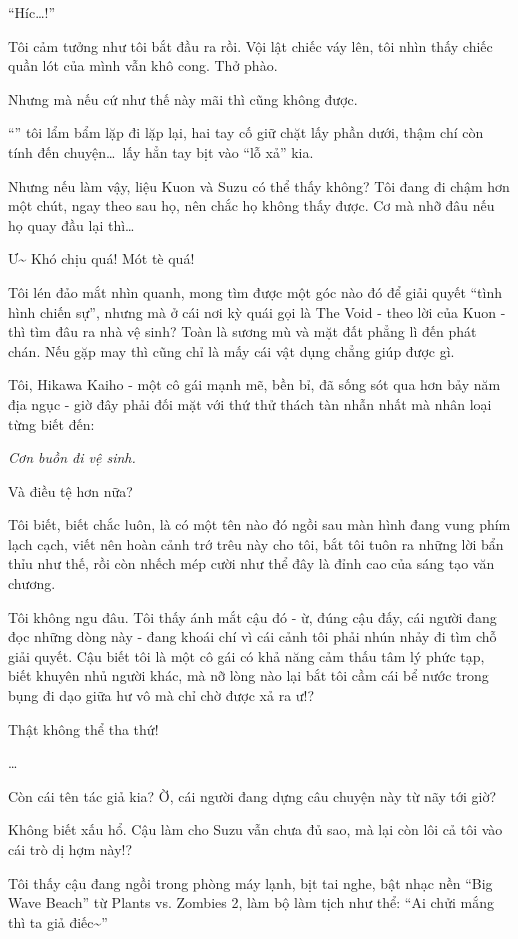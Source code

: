 \documentclass[../main.tex]{subfiles}
\begin{document}
``Híc\dots!''

Tôi cảm tưởng như tôi bắt đầu ra rồi. Vội lật chiếc váy lên, tôi nhìn thấy chiếc quần lót của mình vẫn khô cong. Thở phào.

Nhưng mà nếu cứ như thế này mãi thì cũng không được.

``'' tôi lẩm bẩm lặp đi lặp lại, hai tay cố giữ chặt lấy phần dưới, thậm chí còn tính đến chuyện\dots\ lấy hẳn tay bịt vào ``lỗ xả'' kia.

Nhưng nếu làm vậy, liệu Kuon và Suzu có thể thấy không? Tôi đang đi chậm hơn một chút, ngay theo sau họ, nên chắc họ không thấy được. Cơ mà nhỡ đâu nếu họ quay đầu lại thì\dots

Ư\~{} Khó chịu quá! Mót tè quá!

Tôi lén đảo mắt nhìn quanh, mong tìm được một góc nào đó để giải quyết ``tình hình chiến sự'', nhưng mà ở cái nơi kỳ quái gọi là The Void  - theo lời của Kuon - thì tìm đâu ra nhà vệ sinh? Toàn là sương mù và mặt đất phẳng lì đến phát chán. Nếu gặp may thì cũng chỉ là mấy cái vật dụng chẳng giúp được gì.

Tôi, Hikawa Kaiho - một cô gái mạnh mẽ, bền bỉ, đã sống sót qua hơn bảy năm địa ngục - giờ đây phải đối mặt với thứ thử thách tàn nhẫn nhất mà nhân loại từng biết đến:

\emph{Cơn buồn đi vệ sinh.}

Và điều tệ hơn nữa?

Tôi biết, biết chắc luôn, là có một tên nào đó ngồi sau màn hình đang vung phím lạch cạch, viết nên hoàn cảnh trớ trêu này cho tôi, bắt tôi tuôn ra những lời bẩn thỉu như thế, rồi còn nhếch mép cười như thể đây là đỉnh cao của sáng tạo văn chương.

Tôi không ngu đâu. Tôi thấy ánh mắt cậu đó - ừ, đúng cậu đấy, cái người đang đọc những dòng này - đang khoái chí vì cái cảnh tôi phải nhún nhảy đi tìm chỗ giải quyết. Cậu biết tôi là một cô gái có khả năng cảm thấu tâm lý phức tạp, biết khuyên nhủ người khác, mà nỡ lòng nào lại bắt tôi cầm cái bể nước trong bụng đi dạo giữa hư vô mà chỉ chờ được xả ra ư!?

Thật không thể tha thứ!

\dots

Còn cái tên tác giả kia? Ờ, cái người đang dựng câu chuyện này từ nãy tới giờ?

Không biết xấu hổ. Cậu làm cho Suzu vẫn chưa đủ sao, mà lại còn lôi cả tôi vào cái trò dị hợm này!?

Tôi thấy cậu đang ngồi trong phòng máy lạnh, bịt tai nghe, bật nhạc nền ``Big Wave Beach'' từ Plants vs. Zombies 2, làm bộ làm tịch như thể: ``Ai chửi mắng thì ta giả điếc\~{}''
\end{document}
